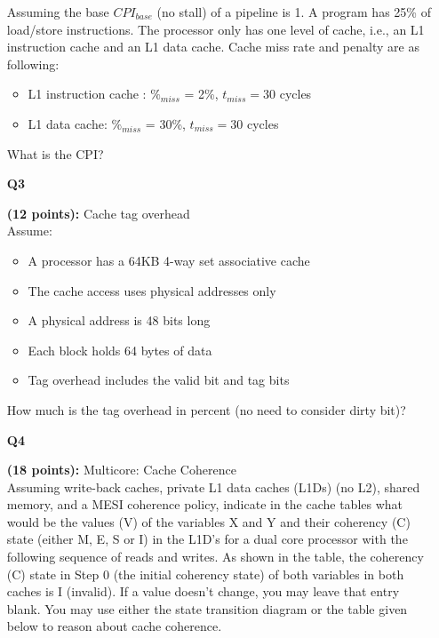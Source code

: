 \documentclass[a4paper,10pt]{article}
\begin{document}
\begin{enumerate}
{        Assuming the base $CPI_{base}$ (no stall) of a pipeline is 1. A program has 25\% of load/store 
        instructions. The processor only has one level of cache, i.e., an L1 instruction cache and 
        an L1 data cache. Cache miss rate and penalty are as following:
        
         \begin{itemize}
            \item{L1 instruction cache : $\%_{miss}$ = 2\%, $t_{miss} = 30$ cycles}
            \item{L1 data cache: $\%_{miss}$ = 30\%, $t_{miss} = 30$ cycles}
         \end{itemize}
         
        What is the CPI?
        \pagebreak
    }
    
    \item[\textbf{Q3}]{\textbf{(12 points):} Cache tag overhead \\
    
        Assume:
        \begin{itemize}
            \item A processor has a 64KB 4-way set associative cache
            \item The cache access uses physical addresses only
            \item A physical address is 48 bits long 
            \item Each block holds 64 bytes of data
            \item Tag overhead includes the valid bit and tag bits
        \end{itemize}
        
        How much is the tag overhead in percent (no need to consider dirty bit)?
        \pagebreak
    }
    \item[\textbf{Q4}]{\textbf{(18 points):} Multicore: Cache Coherence \\ 
    
        Assuming write-back caches, private L1 data caches (L1Ds) (no L2), shared memory, 
        and a MESI coherence policy, indicate in the cache tables what would 
        be the values (V) of the variables X and Y and their coherency (C) state (either M, E, S or
        I) in the L1D’s for a dual core processor with the following sequence of reads and writes. 
        As shown in the table, the coherency (C) state in Step 0 (the initial coherency state) of 
        both variables in both caches is I (invalid). If a value doesn’t change, you may leave that 
        entry blank. You may use either the state transition diagram or the table given below to 
        reason about cache coherence.
        
}
\end{enumerate}
\end{document}
